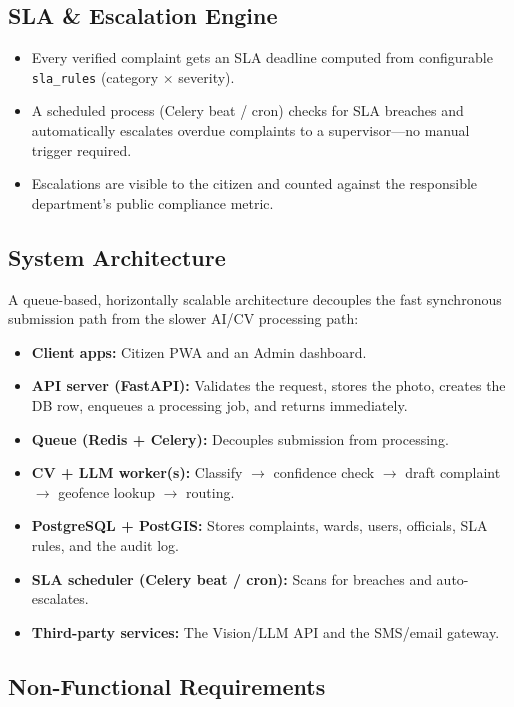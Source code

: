 \documentclass[12pt,a4paper]{article}
\begin{document}
\subsection{SLA \& Escalation Engine}

\begin{itemize}
    \item Every verified complaint gets an SLA deadline computed from configurable \texttt{sla\_rules} (category $\times$ severity).
    \item A scheduled process (Celery beat / cron) checks for SLA breaches and automatically escalates overdue complaints to a supervisor---no manual trigger required.
    \item Escalations are visible to the citizen and counted against the responsible department's public compliance metric.
\end{itemize}

\subsection{System Architecture}

A queue-based, horizontally scalable architecture decouples the fast synchronous submission path from the slower AI/CV processing path:
\begin{itemize}
    \item \textbf{Client apps:} Citizen PWA and an Admin dashboard.
    \item \textbf{API server (FastAPI):} Validates the request, stores the photo, creates the DB row, enqueues a processing job, and returns immediately.
    \item \textbf{Queue (Redis + Celery):} Decouples submission from processing.
    \item \textbf{CV + LLM worker(s):} Classify $\rightarrow$ confidence check $\rightarrow$ draft complaint $\rightarrow$ geofence lookup $\rightarrow$ routing.
    \item \textbf{PostgreSQL + PostGIS:} Stores complaints, wards, users, officials, SLA rules, and the audit log.
    \item \textbf{SLA scheduler (Celery beat / cron):} Scans for breaches and auto-escalates.
    \item \textbf{Third-party services:} The Vision/LLM API and the SMS/email gateway.
\end{itemize}

\subsection{Non-Functional Requirements}
\end{document}
